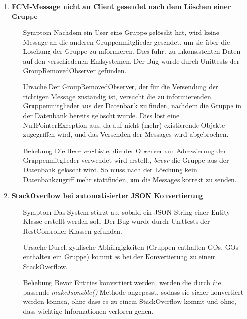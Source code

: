 \documentclass[11pt,a4paper]{scrartcl}
\def\threedigits#1{%
  \ifnum#1<100 0\fi
  \ifnum#1<10 0\fi
  \number#1}
\begin{document}
\begin{enumerate}[label={\textbf{/B\protect\threedigits{\theenumi}0/}}, leftmargin=*]
\item \textbf{FCM-Message nicht an Client gesendet nach dem Löschen einer Gruppe}
	\begin{itemize}
		\item[Symptom]
		Nachdem ein User eine Gruppe gelöscht hat, wird keine Message an die anderen Gruppenmitglieder gesendet, um sie über die Löschung der Gruppe zu informieren. Dies führt zu inkonsistenten Daten auf den verschiedenen Endsystemen. Der Bug wurde durch Unittests der GroupRemovedObserver gefunden.
		\item[Ursache]
		Der GroupRemovedObserver, der für die Versendung der richtigen Message zuständig ist, versucht die zu informierenden Gruppenmitglieder aus der Datenbank zu finden, nachdem die Gruppe in der Datenbank bereits gelöscht wurde. Dies löst eine NullPointerException aus, da auf nicht (mehr) existierende Objekte zugegriffen wird, und das Versenden der Messages wird abgebrochen.
		\item[Behebung]
		Die Receiver-Liste, die der Observer zur Adressierung der Gruppenmitglieder verwendet wird erstellt, \textit{bevor} die Gruppe aus der Datenbank gelöscht wird. So muss nach der Löschung kein Datenbankzugriff mehr stattfinden, um die Messages korrekt zu senden.
	\end{itemize}

\item \textbf{StackOverflow bei automatisierter JSON Konvertierung}
	\begin{itemize}
		\item[Symptom]
		Das System stürzt ab, sobald ein JSON-String einer Entity-Klasse erstellt werden soll. Der Bug wurde durch Unittests der RestController-Klassen gefunden.
		\item[Ursache]
		Durch zyklische Abhängigkeiten (Gruppen enthalten GOs, GOs enthalten ein Gruppe) kommt es bei der Konvertierung zu einem StackOverflow.
		\item[Behebung]
		Bevor Entities konvertiert werden, werden die durch die passende \textit{makeJsonable()}-Methode angepasst, sodass sie sicher konvertiert werden können, ohne dass es zu einem StackOverflow kommt und ohne, dass wichtige Informationen verloren gehen.
	\end{itemize}


\end{enumerate}
\end{document}
